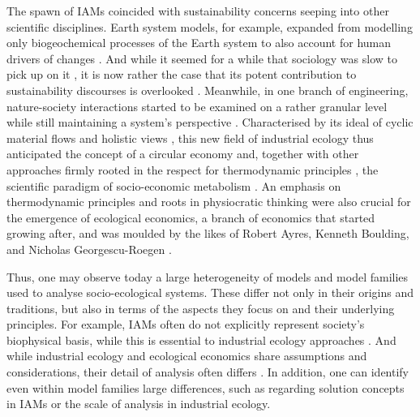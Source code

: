 The spawn of IAMs coincided with sustainability concerns seeping into other scientific disciplines. Earth system models, for example, expanded from modelling only biogeochemical processes of the Earth system to also account for human drivers of changes \parencite{flato_2011}.\footnotemark{} And while it seemed for a while that sociology was slow to pick up on it \parencite{passerini_1998}, it is now rather the case that its potent contribution to sustainability discourses is overlooked \parencite{longo_2021}. Meanwhile, in one branch of engineering, nature-society interactions started to be examined on a rather granular level while still maintaining a system's perspective \parencite{frosch_1989,ausubel_1992}. Characterised by its ideal of cyclic material flows and holistic views \parencite{jelinski_1992}, this new field of industrial ecology thus anticipated the concept of a circular economy \parencite{kalmykova_2018,merli_2018} and, together with other approaches firmly rooted in the respect for thermodynamic principles \parencite{haberl_2019}, the scientific paradigm of socio-economic metabolism \parencite{pauliuk_2015}. An emphasis on thermodynamic principles and roots in physiocratic thinking were also crucial for the emergence of ecological economics, a branch of economics that started growing after, and was moulded by the likes of Robert Ayres, Kenneth Boulding, and Nicholas Georgescu-Roegen \parencite{cleveland_1999}.


Thus, one may observe today a large heterogeneity of models and model families used to analyse socio-ecological systems. These differ not only in their origins and traditions, but also in terms of the aspects they focus on and their underlying principles. For example, IAMs often do not explicitly represent society's biophysical basis, while this is essential to industrial ecology approaches \parencite{pauliuk_2017}. And while industrial ecology and ecological economics share assumptions and considerations, their detail of analysis often differs \parencite{kronenberg_2006}. In addition, one can identify even within model families large differences, such as regarding solution concepts in IAMs or the scale of analysis in industrial ecology.

